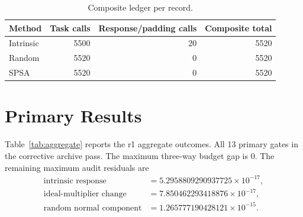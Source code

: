 \documentclass[11pt]{article}
\begin{document}
\begin{table}[h]
\centering
\caption{Composite ledger per record.}
\begin{tabular}{lrrr}
\toprule
Method & Task calls & Response/padding calls & Composite total\\
\midrule
Intrinsic & 5500 & 20 & 5520\\
Random & 5520 & 0 & 5520\\
SPSA & 5520 & 0 & 5520\\
\bottomrule
\end{tabular}
\end{table}

\section{Primary Results}

Table~\ref{tab:aggregate} reports the r1 aggregate outcomes.  All 13 primary
gates in the corrective archive pass.  The maximum three-way budget gap is
0. The remaining maximum audit residuals are
\begin{align*}
\text{intrinsic response} &= 5.2958809290937725\times 10^{-17},\\
\text{ideal-multiplier change} &= 7.850462293418876\times 10^{-17},\\
\text{random normal component} &= 1.265777190428121\times 10^{-15}.
\end{align*}

\begin{table}[h]
\centering
\caption{Primary aggregate held-out gains in the v0.9.4-r1 corrective archive.}
\label{tab:aggregate}
\end{table}
\end{document}
